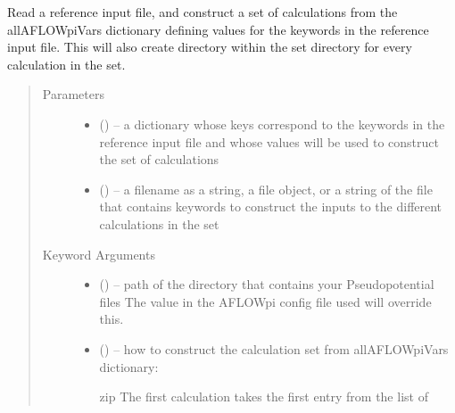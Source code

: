 \documentclass[letterpaper,10pt,english]{sphinxmanual}
\begin{document}
\begin{fulllineitems}
\label{\detokenize{prep:prep.scfs}}
Read a reference input file, and construct a set of calculations from the allAFLOWpiVars
dictionary defining values for the keywords in the reference input file. This will
also create directory within the set directory for every calculation in the set.
\begin{quote}\begin{description}
\item[{Parameters}] \leavevmode\begin{itemize}
\item {} 
 () -- a dictionary whose keys correspond to the keywords in the
reference input file and whose values will be used to
construct the set of calculations

\item {} 
 () -- a filename as a string, a file object, or a string of the file
that contains keywords to construct the inputs to the different
calculations in the set

\end{itemize}

\item[{Keyword Arguments}] \leavevmode\begin{itemize}
\item {} 
 () -- path of the directory that contains your Pseudopotential files
The value in the AFLOWpi config file used will override this.

\item {} 
 () -- 
how to construct the calculation set from allAFLOWpiVars dictionary:
\begin{description}
\item[{zip \textbar{} The first calculation takes the first entry from the list of}] \leavevmode
{}


\end{description}
\end{itemize}
\end{description}
\end{quote}
\end{fulllineitems}
\end{document}
